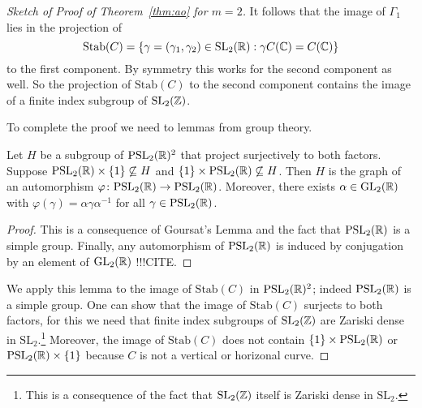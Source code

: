 \begin{proof}[Sketch of Proof of Theorem~\ref{thm:ao} for $m=2$]
  It follows that the image of
  $\Gamma_1$ lies in the projection of
  \begin{equation*}
    \mathrm{Stab}(C) = \{\gamma= (\gamma_1,\gamma_2) \in \mathrm{SL}_2({\mathbb{R}}) :
    \gamma C({\mathbb{C}}) =  C({\mathbb{C}}) \}
  \end{equation*}
  to the first component. 
  By symmetry this works for the second component as well. So the
  projection of $\mathrm{Stab}(C)$ to the second component contains 
  the image of a finite index subgroup of $\mathrm{SL}_2({\mathbb{Z}})$.
  
  To complete the proof we need to lemmas from group theory.
  
  \begin{lemma}
    Let $H$ be a subgroup of $\mathrm{PSL}_2({\mathbb{R}})^2$ that
    project surjectively to both factors. Suppose
    $\mathrm{PSL}_2({\mathbb{R}})\times\{1\}\not\subseteq H$
    and $\{1\}\times \mathrm{PSL}_2({\mathbb{R}})\not\subseteq H$. Then
    $H$ is the graph of an automorphism
    $\varphi\colon \mathrm{PSL}_2({\mathbb{R}})\rightarrow \mathrm{PSL}_2({\mathbb{R}})$. Moreover,
    there exists $\alpha\in \mathrm{GL}_2({\mathbb{R}})$ with
    $\varphi(\gamma) = \alpha\gamma\alpha^{-1}$ for all
    $\gamma\in\mathrm{PSL}_2({\mathbb{R}})$.
  \end{lemma}
  \begin{proof}
    This is a consequence of Goursat's Lemma and the fact that
    $\mathrm{PSL}_2({\mathbb{R}})$ is a simple group. Finally, any automorphism of
    $\mathrm{PSL}_2({\mathbb{R}})$ is induced by conjugation by an element of
    $\mathrm{GL}_2({\mathbb{R}})$ !!!CITE.
  \end{proof}

  We apply this lemma to the image of $\mathrm{Stab}(C)$ in
  $\mathrm{PSL}_2({\mathbb{R}})^2$; indeed
  $\mathrm{PSL}_2({\mathbb{R}})$ is
  a simple group.
  One can show that the image of $\mathrm{Stab}(C)$ surjects to both factors, for
  this we need that finite index subgroups of $\mathrm{SL}_2({\mathbb{Z}})$ are
  Zariski dense in $\mathrm{SL}_2$.\footnote{This is a
    consequence of the fact that $\mathrm{SL}_2({\mathbb{Z}})$ itself is
    Zariski dense in $\mathrm{SL}_2$.}
  Moreover, the image of $\mathrm{Stab}(C)$ does not contain $\{1\}\times
  \mathrm{PSL}_2({\mathbb{R}})$ or  $\mathrm{PSL}_2({\mathbb{R}}) \times\{1\}$ because $C$
  is not a  vertical or horizonal curve. 


\end{proof}

